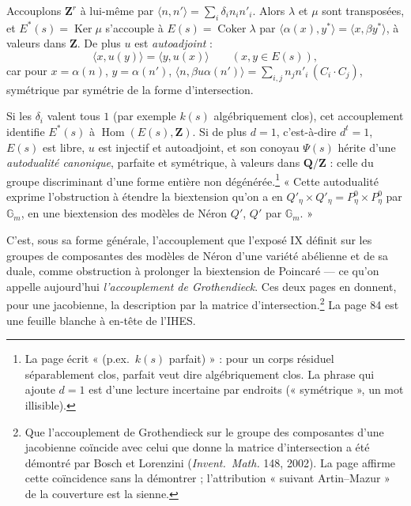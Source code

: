\documentclass[11pt,a4paper]{article}
\begin{document}
Accouplons $\mathbf{Z}^r$ à lui-même par $\langle n, n'\rangle = \sum_i
\delta_in_in'_i$. Alors $\lambda$ et $\mu$ sont transposées, et $E^*(s) =
\operatorname{Ker}\mu$ s'accouple à $E(s) = \operatorname{Coker}\lambda$ par
$\langle\alpha(x), y^*\rangle = \langle x, \beta y^*\rangle$, à valeurs dans
$\mathbf{Z}$. De plus $u$ est \emph{autoadjoint} :
\[ \langle x, u(y)\rangle = \langle y, u(x)\rangle \qquad (x, y \in E(s)), \]
car pour $x = \alpha(n)$, $y = \alpha(n')$, $\langle n, \beta u\alpha(n')\rangle
= \sum_{i,j} n_jn'_i\,(C_i \cdot C_j)$, symétrique par symétrie de la forme
d'intersection.

Si les $\delta_i$ valent tous $1$ (par exemple $k(s)$ algébriquement clos), cet
accouplement identifie $E^*(s)$ à $\operatorname{Hom}(E(s), \mathbf{Z})$. Si de
plus $d = 1$, c'est-à-dire $d^t = 1$, $E(s)$ est libre, $u$ est injectif et
autoadjoint, et son conoyau $\Psi(s)$ hérite d'une \emph{autodualité canonique},
parfaite et symétrique, à valeurs dans $\mathbf{Q}/\mathbf{Z}$ : celle du groupe
discriminant d'une forme entière non dégénérée.\footnote{La page écrit « (p.ex.\
$k(s)$ parfait) » : pour un corps résiduel séparablement clos, parfait veut dire
algébriquement clos. La phrase qui ajoute $d = 1$ est d'une lecture incertaine
par endroits (« symétrique », un mot illisible).} « Cette autodualité exprime
l'obstruction à étendre la biextension qu'on a en $Q'_\eta \times Q'_\eta =
P^0_\eta \times P^0_\eta$ par $\mathbb{G}_m$, en une biextension des modèles de
Néron $Q'$, $Q'$ par $\mathbb{G}_m$. »

C'est, sous sa forme générale, l'accouplement que l'exposé IX définit sur les
groupes de composantes des modèles de Néron d'une variété abélienne et de sa
duale, comme obstruction à prolonger la biextension de Poincaré --- ce qu'on
appelle aujourd'hui \emph{l'accouplement de Grothendieck}. Ces deux pages en
donnent, pour une jacobienne, la description par la matrice
d'intersection.\footnote{Que l'accouplement de Grothendieck sur le groupe des
composantes d'une jacobienne coïncide avec celui que donne la matrice
d'intersection a été démontré par Bosch et Lorenzini (\emph{Invent.\ Math.} 148,
2002). La page affirme cette coïncidence sans la démontrer ; l'attribution « suivant
Artin--Mazur » de la couverture est la sienne.} La page 84 est une feuille
blanche à en-tête de l'IHES.
\end{document}
